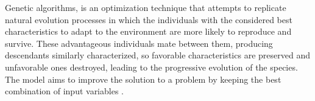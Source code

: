 Genetic algorithms, is an optimization technique that attempts to replicate natural evolution 
processes in which the individuals with the considered best characteristics to adapt to the 
environment are more likely to reproduce and survive. These advantageous individuals mate between 
them, producing descendants similarly characterized, so favorable characteristics are preserved and 
unfavorable ones destroyed, leading to the progressive evolution of the species. The model aims 
to improve the solution to a problem by keeping the best combination of input variables 
\citep{Haupt2004}. 
% 
% 
%   
